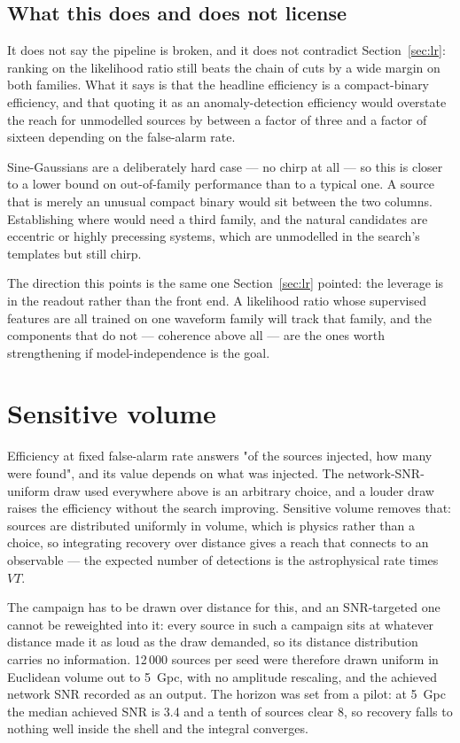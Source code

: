 \documentclass[11pt]{article}
\begin{document}
\subsection*{What this does and does not license}

It does not say the pipeline is broken, and it does not contradict
Section~\ref{sec:lr}: ranking on the likelihood ratio still beats the chain of cuts by a
wide margin on both families. What it says is that the headline efficiency is a
compact-binary efficiency, and that quoting it as an anomaly-detection efficiency would
overstate the reach for unmodelled sources by between a factor of three and a factor of
sixteen depending on the false-alarm rate.

Sine-Gaussians are a deliberately hard case --- no chirp at all --- so this is closer to
a lower bound on out-of-family performance than to a typical one. A source that is
merely an unusual compact binary would sit between the two columns. Establishing where
would need a third family, and the natural candidates are eccentric or highly precessing
systems, which are unmodelled in the search's templates but still chirp.

The direction this points is the same one Section~\ref{sec:lr} pointed: the leverage is
in the readout rather than the front end. A likelihood ratio whose supervised features
are all trained on one waveform family will track that family, and the components that
do not --- coherence above all --- are the ones worth strengthening if
model-independence is the goal.

\section{Sensitive volume}
\label{sec:vt}

Efficiency at fixed false-alarm rate answers "of the sources injected, how many were
found", and its value depends on what was injected. The network-SNR-uniform draw used
everywhere above is an arbitrary choice, and a louder draw raises the efficiency without
the search improving. Sensitive volume removes that: sources are distributed uniformly in
volume, which is physics rather than a choice, so integrating recovery over distance
gives a reach that connects to an observable --- the expected number of detections is the
astrophysical rate times $VT$.

The campaign has to be drawn over distance for this, and an SNR-targeted one cannot be
reweighted into it: every source in such a campaign sits at whatever distance made it as
loud as the draw demanded, so its distance distribution carries no information.
12\,000 sources per seed were therefore drawn uniform in Euclidean volume out to 5~Gpc,
with no amplitude rescaling, and the achieved network SNR recorded as an output. The
horizon was set from a pilot: at 5~Gpc the median achieved SNR is 3.4 and a tenth of
sources clear 8, so recovery falls to nothing well inside the shell and the integral
converges.
\end{document}
